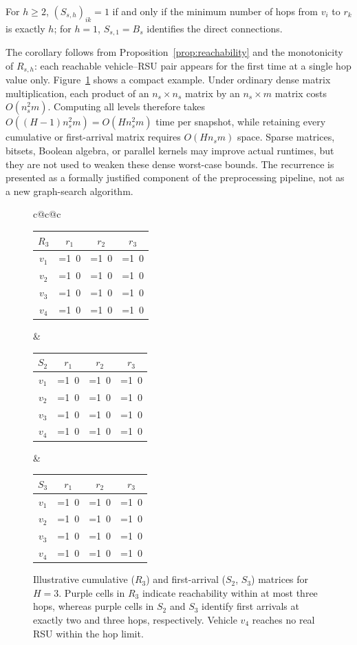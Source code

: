 \documentclass[engproc,proceedingpaper,submit,oneauthor]{Definitions/mdpi}
\begin{document}
\begin{Corollary}\label{cor:minhop}
For $h\ge 2$, $(S_{s,h})_{ik}=1$ if and only if the minimum number of hops from $v_i$
to $r_k$ is exactly $h$; for $h=1$, $S_{s,1}=B_s$ identifies the direct connections.
\end{Corollary}

The corollary follows from Proposition~\ref{prop:reachability} and the monotonicity of
$R_{s,h}$: each reachable vehicle--RSU pair appears for the first time at a single hop
value only. Figure~\ref{fig:matrices} shows a compact example. Under ordinary dense
matrix multiplication, each product of an $n_s\times n_s$ matrix by an $n_s\times m$
matrix costs $O(n_s^2m)$. Computing all levels therefore takes
$O((H-1)n_s^2m)=O(Hn_s^2m)$ time per snapshot, while retaining every cumulative or
first-arrival matrix requires $O(Hn_sm)$ space. Sparse matrices, bitsets, Boolean
algebra, or parallel kernels may improve actual runtimes, but they are not used to
weaken these dense worst-case bounds. The recurrence is presented as a formally
justified component of the preprocessing pipeline, not as a new graph-search algorithm.

\begin{figure}[H]
\centering
\newcommand{\hc}[1]{\ifnum#1=1\cellcolor{violet!60}\textcolor{white}{1}\else\cellcolor{gray!8}0\fi}
\small
\begin{tabular}{c@{\hskip 6mm}c@{\hskip 6mm}c}
\begin{tabular}{c|ccc}
$R_3$ & $r_1$ & $r_2$ & $r_3$\\\hline
$v_1$ & \hc1 & \hc1 & \hc1\\
$v_2$ & \hc1 & \hc1 & \hc1\\
$v_3$ & \hc1 & \hc1 & \hc1\\
$v_4$ & \hc0 & \hc0 & \hc0
\end{tabular}&
\begin{tabular}{c|ccc}
$S_2$ & $r_1$ & $r_2$ & $r_3$\\\hline
$v_1$ & \hc0 & \hc0 & \hc1\\
$v_2$ & \hc1 & \hc1 & \hc0\\
$v_3$ & \hc0 & \hc0 & \hc1\\
$v_4$ & \hc0 & \hc0 & \hc0
\end{tabular}&
\begin{tabular}{c|ccc}
$S_3$ & $r_1$ & $r_2$ & $r_3$\\\hline
$v_1$ & \hc0 & \hc1 & \hc0\\
$v_2$ & \hc0 & \hc0 & \hc0\\
$v_3$ & \hc1 & \hc0 & \hc0\\
$v_4$ & \hc0 & \hc0 & \hc0
\end{tabular}
\end{tabular}
\caption{Illustrative cumulative ($R_3$) and first-arrival ($S_2$, $S_3$) matrices for
$H=3$. Purple cells in $R_3$ indicate reachability within at most three hops, whereas
purple cells in $S_2$ and $S_3$ identify first arrivals at exactly two and three hops,
respectively. Vehicle $v_4$ reaches no real RSU within the hop limit.}\label{fig:matrices}
\end{figure}
\end{document}
